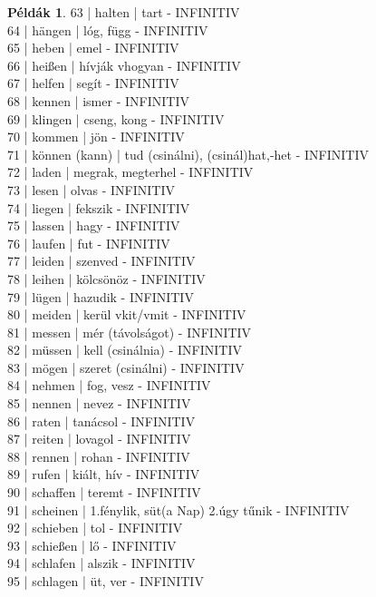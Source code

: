 \documentclass{article}
\theoremstyle{definition}
\newtheorem*{exmp}{Példák}
\begin{document}
\begin{exmp}
63 | halten | tart - INFINITIV\\
64 | hängen | lóg, függ - INFINITIV\\
65 | heben | emel - INFINITIV\\
66 | heißen | hívják vhogyan - INFINITIV\\
67 | helfen | segít - INFINITIV\\
68 | kennen | ismer - INFINITIV\\
69 | klingen | cseng, kong - INFINITIV\\
70 | kommen | jön - INFINITIV\\
71 | können (kann) | tud (csinálni), (csinál)hat,-het - INFINITIV\\
72 | laden | megrak, megterhel  - INFINITIV\\
73 | lesen | olvas - INFINITIV\\
74 | liegen | fekszik - INFINITIV\\
75 | lassen | hagy - INFINITIV\\
76 | laufen | fut - INFINITIV\\
77 | leiden | szenved - INFINITIV\\
78 | leihen | kölcsönöz - INFINITIV\\
79 | lügen | hazudik - INFINITIV\\
80 | meiden  | kerül vkit/vmit - INFINITIV\\
81 | messen | mér (távolságot) - INFINITIV\\
82 | müssen | kell (csinálnia) - INFINITIV\\
83 | mögen | szeret (csinálni) - INFINITIV\\
84 | nehmen | fog, vesz - INFINITIV\\
85 | nennen | nevez - INFINITIV\\
86 | raten | tanácsol - INFINITIV\\
87 | reiten | lovagol - INFINITIV\\
88 | rennen | rohan - INFINITIV\\
89 | rufen | kiált, hív - INFINITIV\\
90 | schaffen | teremt - INFINITIV\\
91 | scheinen | 1.fénylik, süt(a Nap) 2.úgy tűnik - INFINITIV\\
92 | schieben | tol - INFINITIV\\
93 | schießen | lő - INFINITIV\\
94 | schlafen | alszik - INFINITIV\\
95 | schlagen | üt, ver - INFINITIV\\

\end{exmp}
\end{document}
